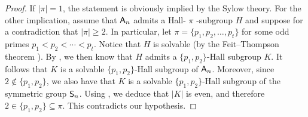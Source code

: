 \documentclass[12pt]{amsart}
\theoremstyle{definition}
\numberwithin{equation}{section}
\newcommand{\Al}{\textup{\textsf{A}}}
\newcommand{\Sy}{\textup{\textsf{S}}}
\begin{document}
\begin{proof}
If $|\pi|=1$, the %
statement is obviously implied by the Sylow theory.
For the other implication, assume that $\Al_n$ admits %
a Hall-
$\pi$%
-subgroup $H$ and suppose for a contradiction that $|\pi|\geq
2$. %
In particular, let %
$\pi=\{p_1,p_2,\ldots, p_t\}$ for some odd
primes $p_1<p_2<\cdots<p_t$. %
Notice that $H$ %
is solvable (by the %
Feit--Thompson %
theorem
\cite{Thompson63}). By \cite{Hall1}, we %
then know that $H$ admits a
$\{p_1,p_2\}$-Hall subgroup $K$. It follows that $K$ is a solvable
$\{p_1,p_2\}$-Hall subgroup of $\Al_n$. Moreover, %
since $2\notin
\{p_1,p_2\}$, we also %
have that $K$ is a solvable $\{p_1,p_2\}$-Hall
subgroup of the symmetric group $\Sy_n$. Using \cite[Theorem
A4]{Hall2}, we deduce that $|K|$ is even, and therefore $2\in
\{p_1,p_2\}\subseteq \pi$. %
This  contradicts %
our hypothesis.
%
%
\end{proof}
\end{document}
